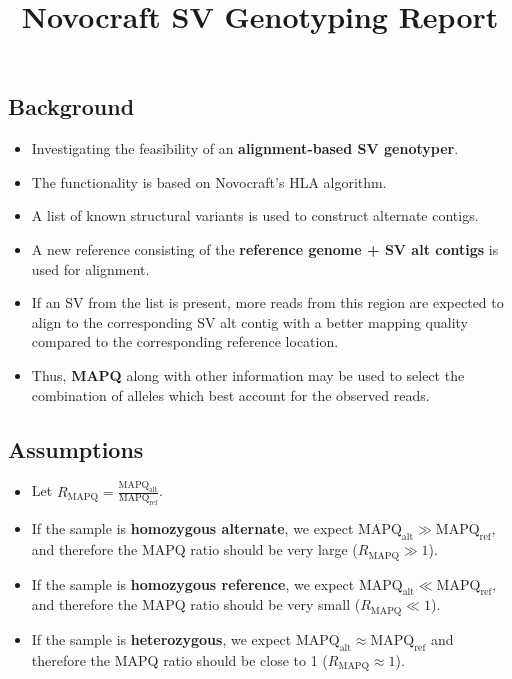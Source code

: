 \documentclass{article}
\title{Novocraft SV Genotyping Report}
\date{\displaydate{articleDate}}
\author{}
\begin{document}
\maketitle

\subsection{Background}

\begin{itemize}
\item Investigating the feasibility of an \textbf{alignment-based SV genotyper}.
\item The functionality is based on Novocraft's HLA algorithm.
\item A list of known structural variants is used to construct alternate contigs.
\item A new reference consisting of the \textbf{reference genome + SV alt contigs} is used for alignment.
\item If an SV from the list is present, more reads from this region are expected to align to the corresponding SV alt contig with a better mapping quality compared to the corresponding reference location.
\item Thus, \textbf{MAPQ} along with other information may be used to select the combination of alleles which best account for the observed reads.
\end{itemize}

\subsection{Assumptions}

\begin{itemize}
\item Let $R_{\text{MAPQ}} = \frac{\text{MAPQ}_{\text{alt}}}{\text{MAPQ}_{\text{ref}}}$.
\item If the sample is \textbf{homozygous alternate}, we expect $\text{MAPQ}_\text{alt} \gg \text{MAPQ}_{\text{ref}}$, and therefore the MAPQ ratio should be very large ($R_{\text{MAPQ}} \gg 1$).
\item If the sample is \textbf{homozygous reference}, we expect $\text{MAPQ}_\text{alt} \ll \text{MAPQ}_{\text{ref}}$, and therefore the MAPQ ratio should be very small ($R_{\text{MAPQ}} \ll 1$).
\item If the sample is \textbf{heterozygous}, we expect $\text{MAPQ}_\text{alt} \approx \text{MAPQ}_{\text{ref}}$ and therefore the MAPQ ratio should be close to 1 ($R_{\text{MAPQ}} \approx 1$).
\end{itemize}
\end{document}
